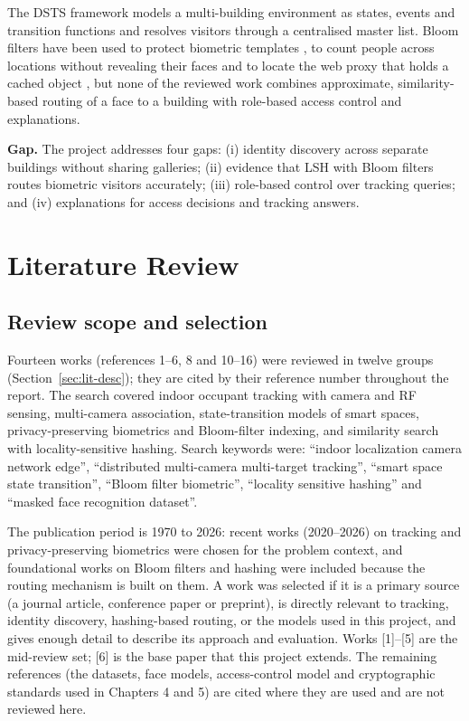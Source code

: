 \documentclass[12pt,a4paper,oneside]{report}
\begin{document}
The DSTS framework \cite{ref6} models a multi-building environment as states, events and transition functions and resolves visitors through a centralised master list. Bloom filters have been used to protect biometric templates \cite{ref10}, to count people across locations without revealing their faces \cite{ref11} and to locate the web proxy that holds a cached object \cite{ref13}, but none of the reviewed work combines approximate, similarity-based routing of a face to a building with role-based access control and explanations.



\textbf{Gap.} The project addresses four gaps: (i) identity discovery across separate buildings without sharing galleries; (ii) evidence that LSH with Bloom filters routes biometric visitors accurately; (iii) role-based control over tracking queries; and (iv) explanations for access decisions and tracking answers.

\clearpage
\chapter{Literature Review}
\section{Review scope and selection}
Fourteen works (references 1--6, 8 and 10--16) were reviewed in twelve groups (Section~\ref{sec:lit-desc}); they are cited by their reference number throughout the report. The search covered indoor occupant tracking with camera and RF sensing, multi-camera association, state-transition models of smart spaces, privacy-preserving biometrics and Bloom-filter indexing, and similarity search with locality-sensitive hashing. Search keywords were: ``indoor localization camera network edge'', ``distributed multi-camera multi-target tracking'', ``smart space state transition'', ``Bloom filter biometric'', ``locality sensitive hashing'' and ``masked face recognition dataset''.

The publication period is 1970 to 2026: recent works (2020--2026) on tracking and privacy-preserving biometrics were chosen for the problem context, and foundational works on Bloom filters and hashing were included because the routing mechanism is built on them. A work was selected if it is a primary source (a journal article, conference paper or preprint), is directly relevant to tracking, identity discovery, hashing-based routing, or the models used in this project, and gives enough detail to describe its approach and evaluation. Works [1]--[5] are the mid-review set; [6] is the base paper that this project extends. The remaining references (the datasets, face models, access-control model and cryptographic standards used in Chapters 4 and 5) are cited where they are used and are not reviewed here.
\end{document}
